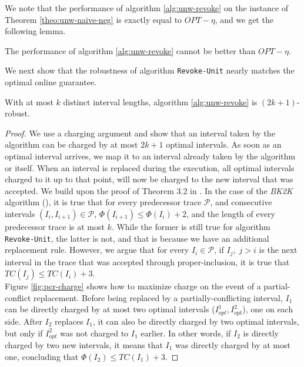 We note that the performance of algorithm \ref{alg:unw-revoke} on the instance of Theorem \ref{theo:unw-naive-neg} is exactly equal to $OPT - \eta$, and we get the following lemma.

\begin{lemma}
    The performance of algorithm \ref{alg:unw-revoke} cannot be better than $OPT-\eta$.
\end{lemma}

We next show that the robustness of algorithm \texttt{Revoke-Unit} nearly matches the optimal online guarantee.

\begin{theorem} \label{theo:unw-rev-robust}
    With at most $k$ distinct interval lengths, algorithm \ref{alg:unw-revoke} is $(2k+1)$-robust.
\end{theorem}
\begin{proof}
    We use a charging argument and show that an interval taken by the algorithm can be charged by at most $2k+1$ optimal intervals. As soon as an optimal interval arrives, we map it to an interval already taken by the algorithm or itself. When an interval is replaced during the execution, all optimal intervals charged to it up to that point, will now be charged to the new interval that was accepted. We build upon the proof of Theorem 3.2 in \cite{borodin2023any}. In the case of the \textit{BK2K} algorithm (\cite{borodin2023any}), it is true that for every predecessor trace $\mathcal{P}$, and consecutive intervals $(I_i,I_{i+1}) \in \mathcal{P}$, $\Phi(I_{i+1}) \leq \Phi(I_i) + 2$, and the length of every predecessor trace is at most $k$. While the former is still true for algorithm \texttt{Revoke-Unit}, the latter is not, and that is because we have an additional replacement rule. However, we argue that for every $I_i \in \mathcal{P}$, if $I_j,\; j > i$ is the next interval in the trace that was accepted through proper-inclusion, it is true that $TC(I_j) \leq TC(I_i) + 3$.\\
    
    Figure \ref{fig:pcr-charge} shows how to maximize charge on the event of a partial-conflict replacement. Before being replaced by a partially-conflicting interval, $I_{1}$ can be directly charged by at most two optimal intervals ($I^{1}_{opt}, I^{2}_{opt}$), one on each side. After $I_{2}$ replaces $I_{1}$, it can also be directly charged by two optimal intervals, but only if $I^{2}_{opt}$ was not charged to $I_{1}$ earlier. In other words, if $I_{2}$ is directly charged by two new intervals, it means that $I_{1}$ was directly charged by at most one, concluding that $\Phi(I_2) \leq TC(I_1) + 3$.


\end{proof}
